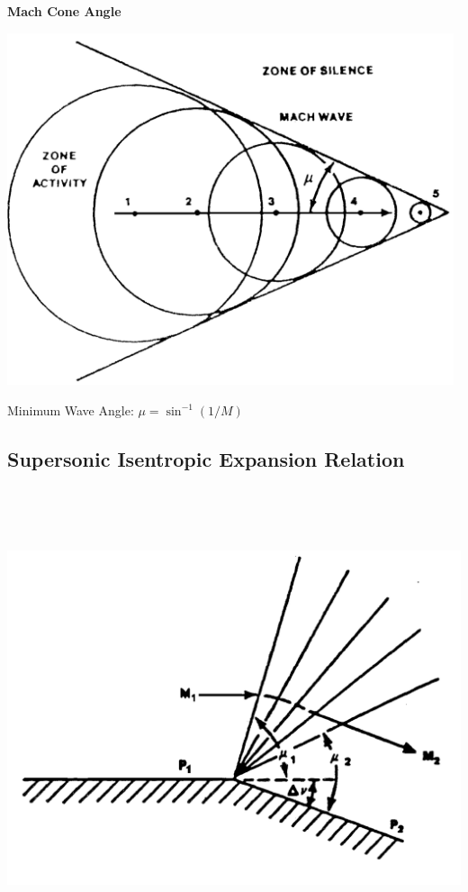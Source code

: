 \documentclass[
]{book}
\begin{document}
\textbf{Mach Cone Angle}

\includegraphics[width=5.163in,height=4.068in]{media/05/image63.svg}

Minimum Wave Angle: \(\mu = \sin^{-1}\left(1/M\right)\)

\hypertarget{supersonic-isentropic-expansion-relation}{%
\subsection{Supersonic Isentropic Expansion Relation}\label{supersonic-isentropic-expansion-relation}}

\includegraphics[width=7.2in,height=5.311in]{media/05/image64.svg}
\end{document}
